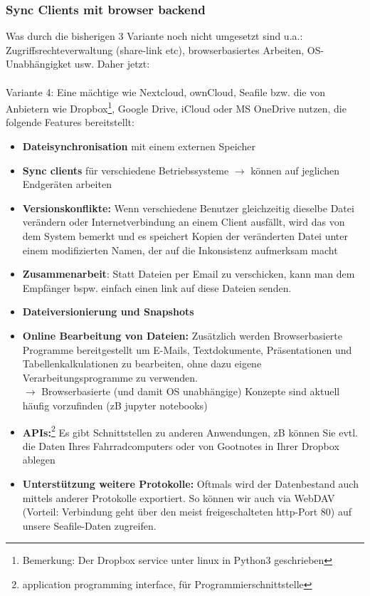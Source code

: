 \subsubsection{Sync Clients mit browser backend} \label{sec:syncclient}
Was durch die bisherigen 3 Variante noch nicht umgesetzt sind u.a.: Zugriffsrechteverwaltung (share-link etc), browserbasiertes Arbeiten, OS-Unabhängigket usw. Daher jetzt:
~\\~\\
Variante 4: Eine mächtige  wie Nextcloud, ownCloud, Seafile bzw. die von Anbietern wie Dropbox\footnote{Bemerkung: Der Dropbox service unter linux in Python3 geschrieben}, Google Drive, iCloud oder MS OneDrive nutzen, die folgende Features bereitstellt:
\begin{itemize}
	\item \textbf{Dateisynchronisation} mit einem externen Speicher
	\item \textbf{Sync clients} für verschiedene Betriebssysteme $\to$ können auf jeglichen Endgeräten arbeiten
	\item \textbf{Versionskonflikte:} Wenn verschiedene Benutzer gleichzeitig dieselbe Datei verändern oder Internetverbindung an einem Client ausfällt, wird das von 
	dem System bemerkt und es speichert Kopien der veränderten Datei unter einem modifizierten Namen, der auf die Inkonsistenz aufmerksam macht
	\item \textbf{Zusammenarbeit}: Statt Dateien per Email zu verschicken, kann man dem Empfänger bspw. einfach einen link auf diese Dateien senden.
	\item \textbf{Dateiversionierung und Snapshots}
	\item \textbf{Online Bearbeitung von Dateien:}
	Zusätzlich werden Browserbasierte Programme bereitgestellt um E-Mails, Textdokumente, Präsentationen und
	Tabellenkalkulationen zu bearbeiten, ohne dazu eigene Verarbeitungsprogramme zu
	verwenden. \\
	$\to$ Browserbasierte (und damit OS unabhängige) Konzepte sind aktuell häufig vorzufinden (zB jupyter notebooks)
	\item \textbf{APIs:}\footnote{application programming interface, für Programmierschnittstelle} Es gibt Schnittstellen zu anderen Anwendungen, zB können Sie evtl. die Daten Ihres Fahrradcomputers oder von Gootnotes in Ihrer Dropbox ablegen
	\item \textbf{Unterstützung weitere Protokolle:} Oftmals wird der Datenbestand auch mittels anderer Protokolle exportiert. So können wir auch via WebDAV (Vorteil: Verbindung geht über den meist freigeschalteten http-Port 80) auf unsere Seafile-Daten zugreifen.
\end{itemize}
